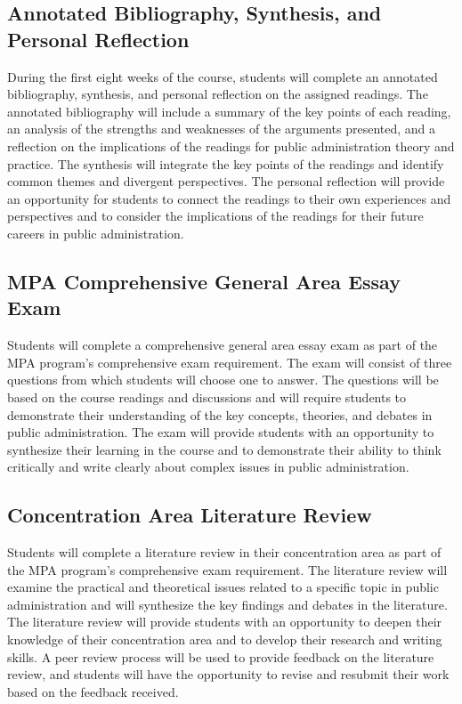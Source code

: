 \documentclass[12pt, letterpaper]{article}
\begin{document}
\subsection*{Annotated Bibliography, Synthesis, and Personal Reflection}

During the first eight weeks of the course, students will complete an annotated bibliography, synthesis, and personal reflection on the assigned readings. The annotated bibliography will include a summary of the key points of each reading, an analysis of the strengths and weaknesses of the arguments presented, and a reflection on the implications of the readings for public administration theory and practice. The synthesis will integrate the key points of the readings and identify common themes and divergent perspectives. The personal reflection will provide an opportunity for students to connect the readings to their own experiences and perspectives and to consider the implications of the readings for their future careers in public administration.

\subsection*{MPA Comprehensive General Area Essay Exam}

Students will complete a comprehensive general area essay exam as part of the MPA program's comprehensive exam requirement. The exam will consist of three questions from which students will choose one to answer. The questions will be based on the course readings and discussions and will require students to demonstrate their understanding of the key concepts, theories, and debates in public administration. The exam will provide students with an opportunity to synthesize their learning in the course and to demonstrate their ability to think critically and write clearly about complex issues in public administration.

\subsection*{Concentration Area Literature Review}

Students will complete a literature review in their concentration area as part of the MPA program's comprehensive exam requirement. The literature review will examine the practical and theoretical issues related to a specific topic in public administration and will synthesize the key findings and debates in the literature. The literature review will provide students with an opportunity to deepen their knowledge of their concentration area and to develop their research and writing skills. A peer review process will be used to provide feedback on the literature review, and students will have the opportunity to revise and resubmit their work based on the feedback received.
\end{document}
